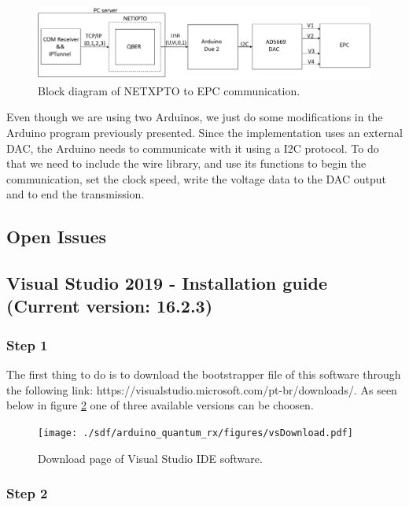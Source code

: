 \begin{refsection}
	
	\begin{figure}[H]
		
		\centering
		\includegraphics[width=1\linewidth]{./sdf/arduino_quantum_rx/figures/DAC.png}
		\caption{Block diagram of NETXPTO to EPC communication.}
		\label{fig:netxpto}

	\end{figure}

	Even though we are using two Arduinos, we just do some modifications in the Arduino program previously presented. Since the implementation uses an external DAC, the Arduino needs to communicate with it using a I2C protocol. To do that we need to include the wire library, and use its functions to begin the communication, set the clock speed, write the voltage data to the DAC output and to end the transmission. 
	
	
	\subsection{Open Issues}
	
	\clearpage
	\subsection{Visual Studio 2019 - Installation guide (Current version: 16.2.3)}
	
	\subsubsection{Step 1}
	
	The first thing to do is to download the bootstrapper file of this software through the following link: https://visualstudio.microsoft.com/pt-br/downloads/. As seen below in figure \ref{vstudio} one of three available versions can be choosen.
	
	\begin{figure}[H]
		\centering
		\texttt{[image: ./sdf/arduino\_quantum\_rx/figures/vsDownload.pdf]}
		\caption{Download page of Visual Studio IDE software.}
		\label{vstudio}
	\end{figure}
	
	
	\subsubsection{Step 2}
	

\end{refsection}
